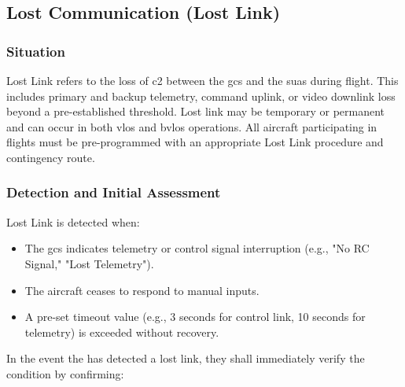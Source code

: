         \subsection{Lost Communication (Lost Link)}\label{ssec:ep-losslink}
           
            \subsubsection{Situation}Lost Link refers to the loss of \ac{c2} between the \ac{gcs} and the \ac{suas} during flight. This includes primary and backup telemetry, command uplink, or video downlink loss beyond a pre-established threshold. Lost link may be temporary or permanent and can occur in both \ac{vlos} and \ac{bvlos} operations. All aircraft participating in \projectmars{} flights must be pre-programmed with an appropriate Lost Link procedure and contingency route.
        
            \subsubsection{Detection and Initial Assessment} Lost Link is detected when:
 
                \begin{itemize}
                    
                    \item The \ac{gcs} indicates telemetry or control signal interruption (e.g., "No RC Signal," "Lost Telemetry").
                    
                    \item The aircraft ceases to respond to manual inputs.
 
                    \item A pre-set timeout value (e.g., 3 seconds for control link, 10 seconds for telemetry) is exceeded without recovery.
                
                \end{itemize}
                
            In the event the  has detected a lost link, they shall immediately verify the condition by confirming:

